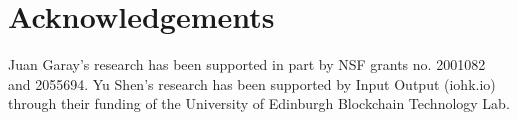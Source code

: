 \section*{Acknowledgements}

Juan Garay's research has been supported in part by NSF grants no. 2001082 and 2055694.
%
Yu Shen's research has been supported by Input Output (iohk.io) through their funding of the University of Edinburgh Blockchain Technology Lab.